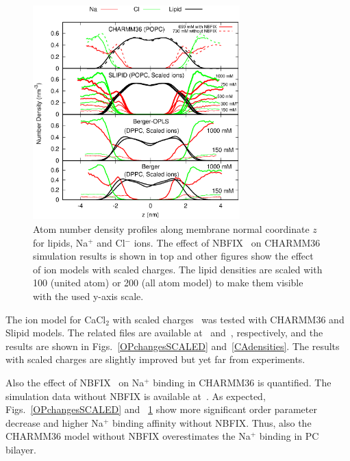 \documentclass[twoside,twocolumn,9pt]{article}
\begin{document}
\begin{figure}[]
  \centering
  \includegraphics[width=8cm]{../Fig/NAdensitiesSCALED.eps} 
  \caption{\label{NAdensitySCALED}
    Atom number density profiles along membrane normal coordinate $z$ for lipids, Na$^+$ and Cl$^-$ ions. 
    The effect of NBFIX~\cite{venable13} on CHARMM36 simulation results is shown in top and other figures show the
    effect of ion models with scaled charges. The lipid densities are scaled with 100 (united atom) or 200 (all atom model) to make them visible with the used y-axis scale.
}
\end{figure}


The ion model for CaCl$_2$ with scaled charges~\cite{kohagen14} was tested with CHARMM36 and Slipid models.
The related files are available at~\cite{charmmFILESpopc450mMcaclSCALED} and~\cite{slipidsFILESpopc450mMcaclSCALED},
respectively, and the results are shown in Figs.~\ref{OPchangesSCALED} and~\ref{CAdensities}.
The results with scaled charges are slightly improved but yet far from experiments.

Also the effect of NBFIX~\cite{venable13} on Na$^+$ binding in CHARMM36 is quantified.
The simulation data without NBFIX is available at~\cite{charmmPOPC350mMNaClnoNBFIXfiles}.
As expected, Figs.~\ref{OPchangesSCALED} and ~\ref{NAdensitySCALED} show 
more significant order parameter decrease and higher Na$^+$ binding affinity
without NBFIX. Thus, also the CHARMM36 model without NBFIX overestimates the
Na$^+$ binding in PC bilayer.

\end{document}
